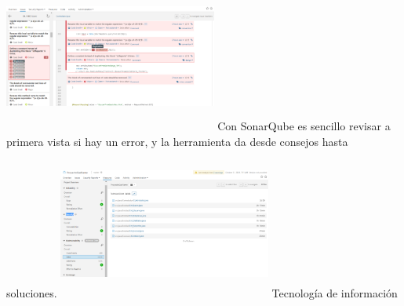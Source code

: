 \documentclass[twoside,twocolumn]{article}
\begin{document}
\newline
\includegraphics[width=7cm, height=5cm]{Image/4.png}
\newline
\newline
Con SonarQube es sencillo revisar a primera vista si hay un error, y la herramienta da desde consejos hasta soluciones. 
\newline
\newline
\includegraphics[width=7cm, height=5cm]{Image/5.png}
\newline
{} Tecnología de información 
\end{document}
